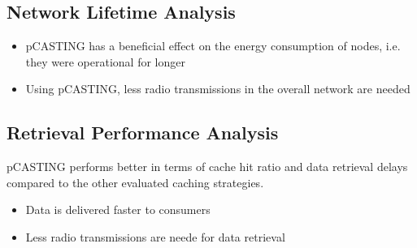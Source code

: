 \documentclass[a0paper,portrait]{baposter}
\begin{document}
\begin{poster}
{\subsection*{Network Lifetime Analysis}
\begin{itemize}
	\item pCASTING has a beneficial effect on the energy consumption of nodes, i.e. they were operational for longer
	\item Using pCASTING, less radio transmissions in the overall network are needed
\end{itemize}

\subsection*{Retrieval Performance Analysis}
pCASTING performs better in terms of cache hit ratio and data retrieval delays compared to the other evaluated caching strategies.

\begin{itemize}
	\item Data is delivered faster to consumers
	\item Less radio transmissions are neede for data retrieval
\end{itemize}

\vspace{1cm}
}






\end{poster}
\end{document}
